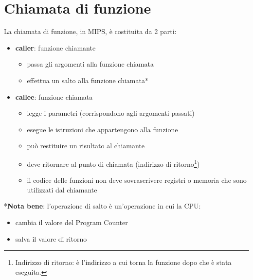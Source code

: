 \documentclass[../main.tex]{subfiles}
\begin{document}
\chapter{Chiamata di funzione}
La chiamata di funzione, in MIPS, è costituita da 2 parti:
\begin{itemize}
    \item \textbf{caller}: funzione chiamante
    \begin{itemize}
        \item passa gli argomenti alla funzione chiamata
        \item effettua un salto alla funzione chiamata*
    \end{itemize}
    \item \textbf{callee}: funzione chiamata
    \begin{itemize}
        \item legge i parametri (corrispondono agli argomenti passati)
        \item esegue le istruzioni che appartengono alla funzione
        \item può restituire un risultato al chiamante
        \item deve ritornare al punto di chiamata (indirizzo di
        ritorno\footnote{Indirizzo di ritorno: è l'indirizzo a cui
        torna la funzione dopo che è stata eseguita.})
        \item il codice delle funzioni non deve sovrascrivere registri
        o memoria che sono utilizzati dal chiamante
    \end{itemize}
\end{itemize}

\vspace*{2mm}

\noindent
*\textbf{Nota bene}: l'operazione di salto è un'operazione in cui la
CPU:
\begin{itemize}
    \item cambia il valore del Program Counter
    \item salva il valore di ritorno
\end{itemize}
\end{document}
